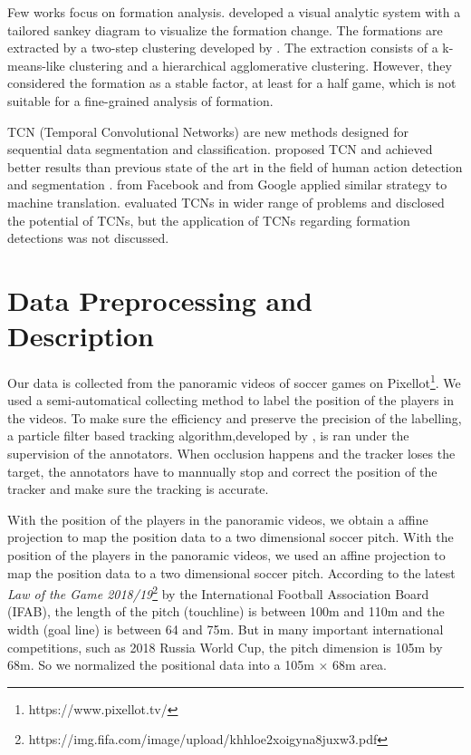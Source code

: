 \documentclass{article}
\begin{document}
Few works focus on formation analysis. \cite{wu2019forvizor} developed a visual analytic system with a tailored sankey diagram to visualize the formation change. The formations are extracted by a two-step clustering developed by \cite{bialkowski2014large}. The extraction consists of a k-means-like clustering and a hierarchical agglomerative clustering. However, they considered the formation as a stable factor, at least for a half game, which is not suitable for a fine-grained analysis of formation.

TCN (Temporal Convolutional Networks) are new methods designed for sequential data segmentation and classification. \cite{lea2017temporal} proposed TCN and achieved better results than previous state of the art in the field of human action detection and segmentation .\cite{gehring2017convolutional} from Facebook and \cite{kalchbrenner2016neural} from Google applied similar strategy to machine translation. \cite{bai2018empirical} evaluated TCNs in wider range of problems and disclosed the potential of TCNs, but the application of TCNs regarding formation detections was not discussed.

\section{Data Preprocessing and Description}
Our data is collected from the panoramic videos of soccer games on Pixellot\footnote{https://www.pixellot.tv/}. We used a semi-automatical collecting method to label the position of the players in the videos. To make sure the efficiency and preserve the precision of the labelling, a particle filter based tracking algorithm,developed by \cite{dearden2006tracking}, is ran under the supervision of the annotators. When occlusion happens and the tracker loses the target, the annotators have to mannually stop and correct the position of the tracker and make sure the tracking is accurate.

With the position of the players in the panoramic videos, we obtain a affine projection to map the position data to a two dimensional soccer pitch. With the position of the players in the panoramic videos, we used an affine projection to map the position data to a two dimensional soccer pitch. 
According to the latest \emph{Law of the Game 2018/19}\footnote{https://img.fifa.com/image/upload/khhloe2xoigyna8juxw3.pdf} by the International Football Association Board (IFAB), the length of the pitch (touchline) is between 100m and 110m and the width (goal line) is between 64 and 75m. But in many important international competitions, such as 2018 Russia World Cup, the pitch dimension is 105m by 68m. So we normalized the positional data into a 105m $\times$ 68m area.
\end{document}

